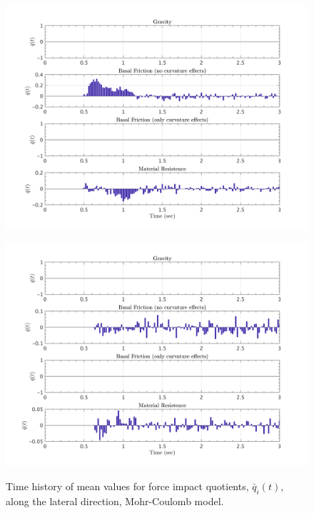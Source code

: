 \documentclass{article}
\begin{document}
\begin{figure}[H]
        \begin{minipage}[b]{0.5\linewidth}
                \centering
                \includegraphics[width=1\textwidth]{InclinedPlane/LocalRecords/ContribF15_C_y.png}
                \label{fig:Ramp-Cy3}
        \end{minipage}
        \begin{minipage}[b]{0.5\linewidth}
                \centering
                \includegraphics[width=1\textwidth]{InclinedPlane/LocalRecords/ContribF17_C_y.png}
                \label{fig:Ramp-Cy4}
        \end{minipage}
        \caption{Time history of mean values for force impact quotients, $\bar{q}_i(t)$, along the lateral direction, Mohr-Coulomb model.}
        \label{fig:Ramp-Cy}
\end{figure}
\end{document}
